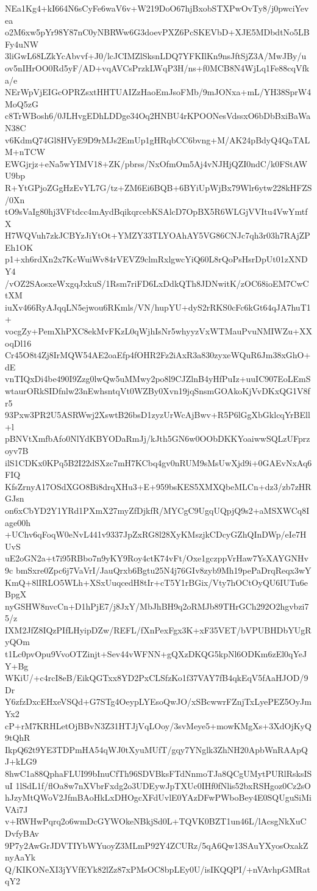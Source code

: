 NEa1Kg4+kI664N6sCyFe6waV6v+W219DoO67hjBxobSTXPwOvTy8/j0pwciYevea
o2M6xw5pYr98Y87nC0yNBRWw6G3doevPXZ6PcSKEVbD+XJE5MDbdtNo5LBFy4uNW
3liGwL68LZkYcAbvvf+J0/lcJCIMZlSksnLDQ7YFKIlKn9nsJftSjZ3A/MwJBy/u
ov5nIHrOO0Rd5yF/AD+vqAVCsPrzkLWqP3H/ns+f0MCB8N4WjLq1Fe88cqVfka/e
NErWpVjEIGcOPRZsxtHHTUAIZzHaoEmJsoFMb/9mJONxa+mL/YH38SprW4MoQ5zG
c8TrWBosh6/0JLHvgEDhLDDge34Oq2HNBU4rKPOONesVdssxO6bDbBxiBaWaN38C
v6KdmQ74Gl8HVyE9D9rMJs2EmUp1gHRqbCC6bvng+M/AK24pBdyQ4QaTALM+nTCW
EWGjrjz+eNa5wYIMV18+ZK/pbrss/NxOfmOm5Aj4vNJHjQZI0ndC/k0FStAWU9bp
R+YtGPjoZGgHzEvYL7G/tz+ZM6Ei6BQB+6BYiUpWjBx79Wlr6ytw228kHFZS/0Xn
tO9sVaIg80hj3VFtdcc4mAydBqikqrcebKSAlcD7OpBX5R6WLGjVVItu4VwYmtfX
H7WQVuh7zkJCBYzJiYtOt+YMZY33TLYOAhAY5VG86CNJc7qh3r03h7RAjZPEh1OK
p1+xh6rdXn2x7KcWuiWv84rVEVZ9clmRxlgwcYiQ60L8rQoPsHsrDpUt01zXNDY4
/vOZ2SAosxeWxgqJxkuS/1Rsm7riFD6LxDdkQTh8JDNwitK/zOC68ioEM7CwCtXM
iuXv466RyAJqqLN5ejwou6RKmls/VN/hupYU+dyS2rRKS0cFc6kGt64qJA7huT1+
vocgZy+PemXhPXC8ekMvFKzL0qWjhIsNr5whyyzVxWTMauPvuNMIWZu+XXoqDl16
Cr45O8t4Zj8IrMQW54AE2oaEfp4fOHR2Fz2iAxR3a830zyxeWQuR6Jm38xGhO+dE
vnTIQxDi4be490I9Zzg0lwQw5uMMwy2po8l9CJZlnB4yHfPuIz+uuIC907EoLEmS
wtaurORkSIDfnlw23nEwhsntqVt0WZBy0Xvn19jqSnsmGOAkoKjVvDKxQG1V8fr5
93Pxw3PR2U5ASRWwj2XswtB26bsD1zyzUrWcAjBwv+R5P6lGgXbGklcqYrBEll+l
pBNVtXmfbAfo0NlYdKBYODaRmJj/kJth5GN6w0OObDKKYoaiwwSQLzUFprzoyv7B
ilS1CDKx0KPq5B2I22dSXzc7mH7KCbq4gv0nRUM9sMsUwXjd9i+0GAEvNxAq6FIQ
KfsZrnyA17OSdXGO8Bi8drqXHu3+E+959bsKES5XMXQbeMLCn+dz3/zb7zHRGJsn
on6xCbYD2Y1YRd1PXmX27myZfDjkfR/MYCgC9UgqUQpjQ9s2+aMSXWCq8Iage00h
+UChv6qFoqW0eNvL441v9337JpZxRG8l28XyKMszjkCDcyGZhQInDWp/eIe7HUvS
uE2oGN2a+t7i95RBbo7n9yKY9Roy4ctK74vFt/Oxe1gczppVrHaw7YsXAYGNHv9c
bmSxre0Zpc6j7VaVrI/JauQrxb6Bgtu25N4j76GIv8zyb9Mh19pePaDrqReqx3wY
KmQ+8lIRLO5WLh+XSxUuqcedH8tIr+cT5Y1rBGix/Vty7hOCtOyQU6IUTu6eBpgX
nyGSHW8nvcCn+D1hPjE7/j8JxY/MbJhBH9q2oRMJb89THrGCh292O2hgvbzi75/z
IXM2JfZ8IQzPIfLHyipDZw/REFL/fXnPexFgx3K+xF35VET/bVPUBHDbYUgRyQOm
t1Lc0pvOpu9VvoOTZinjt+Sev44vWFNN+gQXzDKQG5kpNl6ODKm6zEl0qYeJY+Bg
WKiU/+c4rcI8eB/EikQGTxx8YD2PxCLSfzKo1f37VAY7fB4qkEqV5fAaHJOD/9Dr
Y6zfzDxcEHxeVSQd+G7STg4OeypLYEsoQwJO/xSBcwwrFZnjTxLyePEZ5OyJmYx2
cP+rM7KRHLetOjBBvN3Z31HTJjVqLOoy/3svMeye5+mowKMgXs+3XdOjKyQ9tQhR
IkpQ62t9YE3TDPmHA54qWJ0tXyuMUfT/gqy7YNglk3ZhNH20ApbWnRAApQJ+kLG9
8hwC1a88QphaFLUI99bInuCfTh96SDVBksFTdNnmoTJa8QCgUMytPURlRsksISuI
1lSdL1f/flOa8w7nXVbrFxdg2o3UDEywJpTXUc0IHf0fNlis52bxRSHgoz0Cz2sO
hJzyMtQWoV2JfmBAoHkLxDHOgcXFdUvlE0YAzDFwPWboBey4E0SQUguSiMiVAi7J
v+RWHwPqrq2o6wmDcGYWOkeNBkjSd0L+TQVK0BZT1un46L/lAcsgNkXuCDvfyBAv
9P7y2AwGrJDVTIYbWYuoyZ3MLmP92Y4ZCURz/5qA6Qw13SAuYXyosOxakZnyAaYk
Q/KIKONeXI3jYVfEYk82lZz87xPMsOC8bpLEy0U/isIKQQPI/+nVAvhpGMRatqY2
